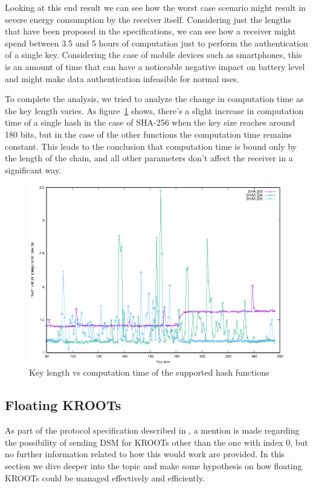 Looking at this end result we can see how the worst case scenario might result
in severe energy consumption by the receiver itself. Considering just the
lengths that have been proposed in the specifications, we can see how a receiver
might spend between 3.5 and 5 hours of computation just to perform the
authentication of a single key. Considering the case of mobile devices such as
smartphones, this is an amount of time that can have a noticeable negative
impact on battery level and might make data authentication infeasible for normal
uses.

To complete the analysis, we tried to analyze the change in computation time as
the key length varies. As figure~\ref{fig:key_length} shows, there's a slight
increase in computation time of a single hash in the case of SHA-256 when the
key size reaches around 180 bits, but in the case of the other functions the
computation time remains constant. This leads to the conclusion that computation
time is bound only by the length of the chain, and all other parameters don't
affect the receiver in a significant way.

\begin{figure}[h!]
  \includegraphics[width=\linewidth]{figures/key_length.eps}
  \caption{Key length vs computation time of the supported hash functions}
  \label{fig:key_length}
\end{figure}

\subsection{Floating KROOTs}
As part of the protocol specification described in \cite{osnma}, a mention
is made regarding the possibility of sending DSM for KROOTs other than the one
with index $0$, but no further information related to how this would work are
provided. In this section we dive deeper into the topic and make some hypothesis
on how floating KROOTs could be managed effectively and efficiently.

